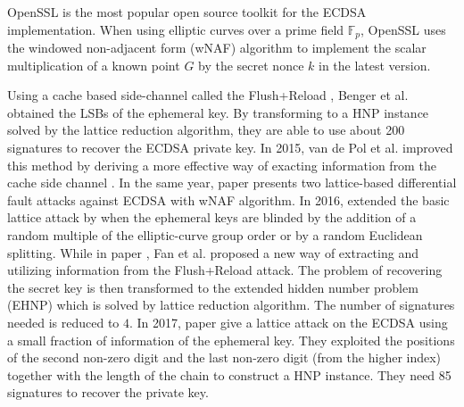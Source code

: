 OpenSSL\cite{openssl} is the most popular open source toolkit for the ECDSA implementation.
When using elliptic curves over a prime field $\mathbb{F}_{p}$,
 OpenSSL uses the windowed non-adjacent form (wNAF) algorithm \cite{GORDON1998129,Miyaji1997,Koyama1002,Solinas2000} to implement the scalar multiplication of a known point $G$ by the secret nonce $k$
  in the latest version.

Using a cache based side-channel called the Flush+Reload \cite{flushreload}, Benger et al. \cite{Benger2014} obtained the
LSBs of the ephemeral key. By transforming to a HNP instance solved by the lattice reduction algorithm, they are able to use about 200 signatures to recover the ECDSA private key.
In 2015, van de Pol et al. improved this method by deriving a more effective way of exacting information from the cache side channel \cite{Van2015}.
In the same year, paper \cite{Cao2015} presents two lattice-based differential fault attacks against ECDSA with wNAF algorithm.
In 2016, \cite{Dahmun2016}  extended the basic lattice attack by when the ephemeral keys are blinded by the addition of a random multiple of the elliptic-curve group order or by a random Euclidean splitting.
While in paper \cite{Fan2016}, Fan et al. proposed a new way of extracting and utilizing information from the Flush+Reload attack. The problem of recovering the
secret key is then transformed to the extended hidden number problem (EHNP) which is solved by lattice reduction algorithm. The number of signatures needed is reduced to $4$.
In 2017, paper \cite{Wang2017} give a lattice attack on the ECDSA using
 a small fraction of information of the ephemeral key.
They exploited the positions of the second non-zero digit and the last non-zero
digit (from the higher index) together with the length of the chain to construct a HNP instance. They need 85 signatures to recover the private key.


